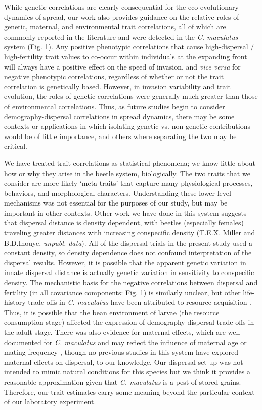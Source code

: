 \documentclass[11pt]{article}
\begin{document}
While genetic correlations are clearly consequential for the eco-evolutionary dynamics of spread, our work also provides guidance on the relative roles of genetic, maternal, and environmental trait correlations, all of which are commonly reported in the literature and were detected in the \textit{C. maculatus} system (Fig. 1).
Any positive phenotypic correlations that cause high-dispersal / high-fertility trait values to co-occur within individuals at the expanding front will always have a positive effect on the speed of invasion, and \textit{vice versa} for negative phenotypic correlations, regardless of whether or not the trait correlation is genetically based.
However, in invasion variability and trait evolution, the roles of genetic correlations were generally much greater than those of environmental correlations.
Thus, as future studies begin to consider demography-dispersal correlations in spread dynamics, there may be some contexts or applications in which isolating genetic vs. non-genetic contributions would be of little importance, and others where separating the two may be critical.

We have treated trait correlations as statistical phenomena; we know little about how or why they arise in the beetle system, biologically.
The two traits that we consider are more likely `meta-traits' that capture many physiological processes, behaviors, and morphological characters.
Understanding these lower-level mechanisms was not essential for the purposes of our study, but may be important in other contexts.
Other work we have done in this system suggests that dispersal distance is density dependent, with beetles (especially females) traveling greater distances with increasing conspecific density (T.E.X. Miller and B.D.Inouye, \textit{unpubl. data}).
All of the dispersal trials in the present study used a constant density, so density dependence does not confound interpretation of the dispersal results.
However, it is possible that the apparent genetic variation in innate dispersal distance is actually genetic variation in sensitivity to conspecific density.
The mechanistic basis for the negative correlations between dispersal and fertility (in all covariance components: Fig. 1) is similarly unclear, but other life-history trade-offs in \textit{C. maculatus} have been attributed to resource acquisition \citep{messina2003environment}.
Thus, it is possible that the bean environment of larvae (the resource consumption stage) affected the expression of demography-dispersal trade-offs in the adult stage.
There was also evidence for maternal effects, which are well documented for \textit{C. maculatus} and may reflect the influence of maternal age or mating frequency \citep{fox1993influence}, though no previous studies in this system have explored maternal effects on dispersal, to our knowledge. 
Our dispersal set-up was not intended to mimic natural conditions for this species but we think it provides a reasonable approximation given that \textit{C. maculatus} is a pest of stored grains.
Therefore, our trait estimates carry some meaning beyond the particular context of our laboratory experiment.
\end{document}
